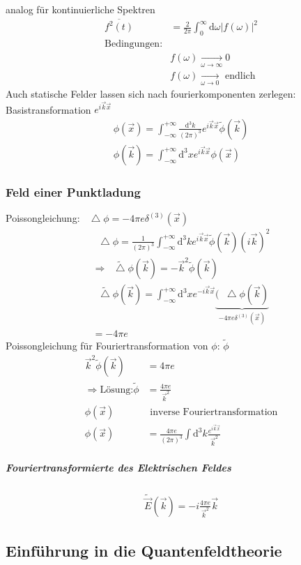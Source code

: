 \documentclass[a4paper]{article}
\newcommand*\laplace{\mathop{}\!\mathbin\bigtriangleup}
\begin{document}
analog für kontinuierliche Spektren
\begin{align}
\overline{f^2(t)}&=\frac{2}{2\pi}\int_0^\infty \mathrm{d}\omega |f(\omega)|^2\\
\text{Bedingungen:}&\\
&f(\omega)\underset{\omega\rightarrow\infty}{\longrightarrow}0\\
&f(\omega)\underset{\omega\rightarrow0}{\longrightarrow} \text{ endlich}
\end{align}
Auch statische Felder lassen sich nach fourierkomponenten zerlegen:
Basistransformation $e^{i\vec{k}\vec{x}}$
\begin{align}
\phi(\vec{x})=\int_{-\infty}^{+\infty} \frac{\mathrm{d}^3k}{(2\pi)^3}
e^{i\vec{k}\vec{x}}\tilde{\phi}(\vec{k})\\
\phi(\vec{k})=\int_{-\infty}^{+\infty} \mathrm{d}^3x
e^{i\vec{k}\vec{x}}\phi(\vec{x})
\end{align}
\subsubsection{Feld einer Punktladung}
Poissongleichung: $\laplace\phi=-4\pi e \delta^{(3)}(\vec{x})$
\begin{align}
\laplace\phi=\frac{1}{(2\pi)^3}\int_{-\infty}^{+\infty} \mathrm{d}^3k e^{i\vec{k}\vec{x}}
\tilde{\phi}(\vec{k})(i\vec{k})^2\\
\Rightarrow \tilde{\laplace \phi}(\vec{k})=-\vec{k}^2 \tilde{\phi}(\vec{k})\\
\tilde{\laplace \phi}(\vec{k})=\int_{-\infty}^{+\infty}\mathrm{d}^3x e^{-i\vec{k}\vec{x}}
\underbrace{(\laplace\phi(\vec{k})}_{-4\pi e \delta^{(3)}(\vec{x})}\\
=-4\pi e
\end{align}
Poissongleichung für Fouriertransformation von $\phi$: $\tilde{\phi}$
\begin{align}
\vec{k}^2\tilde{\phi}(\vec{k})&=4\pi e\\
\Rightarrow \text{Lösung:} \tilde{\phi}&=\frac{4\pi e}{\vec{k}^2}\\
\phi(\vec{x})&\text{ inverse Fouriertransformation}\\
\phi(\vec{x})&=\frac{4\pi e}{(2\pi)^3}\int \mathrm{d}^3k
\frac{e^{i\vec{k}\vec{x}}}{\vec{k}^2}
\end{align}
\subparagraph{Fouriertransformierte des Elektrischen Feldes}
\begin{align}
\tilde{\vec{E}}(\vec{k})=-i\frac{4\pi e}{\vec{k}^2}\vec{k}
\end{align}
\subsection{Einführung in die Quantenfeldtheorie}
\end{document}
